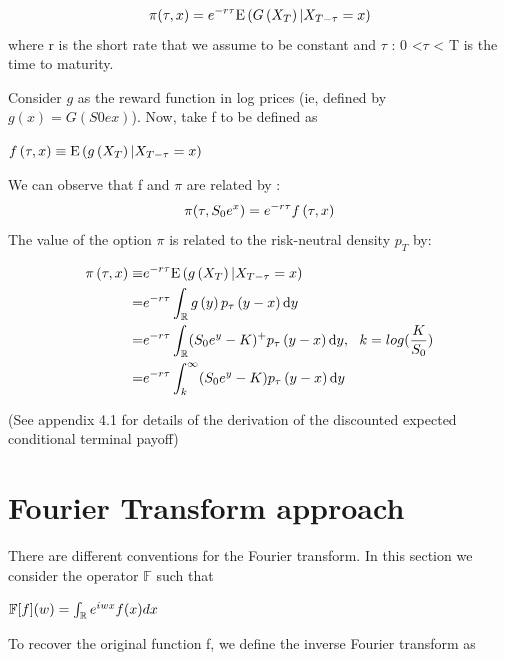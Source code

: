 \documentclass[12pt]{report}
\begin{document}
\begin{gather}
\pi(\tau,x)= e^{-r\tau} \mathrm{E} \left( {{G \left( {X_T} \right)|X_{T-\tau} = x}} \right)
\end{gather}
where r is the short rate that we assume to be constant and $\tau$ : 0 <$\tau$ < T is the time to
maturity.

Consider $g$ as the reward function in log prices (ie, defined by $g(x) = G(S0ex)$). Now, take f to be defined as
\begin{center}
$f \left( {\tau,x} \right) \equiv \mathrm{E} \left( {{g \left( {X_T} \right)|X_{T-\tau} = x}} \right)$
\end{center}

We can observe that f and $ \pi$ are related by :
\begin{gather}
\pi(\tau,S_0 e^x)= e^{-r\tau}f \left( {\tau,x} \right)
\end{gather}
The value of the option $\pi$ is related to the risk-neutral density $p_T$ by:


\begin{align}
\begin{split}
\pi\left( {\tau,x} \right) \equiv & e^{-r\tau}\mathrm{E} \left( {{g \left( {X_T} \right)|X_{T-\tau} = x}} \right)
\\
= &e^{-r\tau}\int_{\mathbb{R}} g\left( {y} \right)  p_\tau \left( {y-x} \right)  \textrm{d} y
\\
=& e^{-r\tau}\int_{\mathbb{R}} (S_0 e^y-K)^+ p_\tau \left( {y-x} \right)  \textrm{d} y, ~~k=log (\frac{K}{S_0})\\
=& e^{-r\tau} \int_k^\infty (S_0 e^y-K) p_\tau \left( {y-x} \right) \textrm{d} y
\label{moneq}
\end{split}
\end{align}

(See appendix 4.1 for details of the derivation of the discounted expected conditional terminal payoff) 

\section{Fourier Transform approach}

There are different conventions for the Fourier transform. In this section we consider the operator
$\mathbb{F}$ such that

\begin{center}

$\mathbb{F}[f](w)= \int_{\mathbb{R}} e^{iwx}f(x) dx $
\end{center}
To recover the original function f, we define the inverse Fourier transform as
\end{document}
